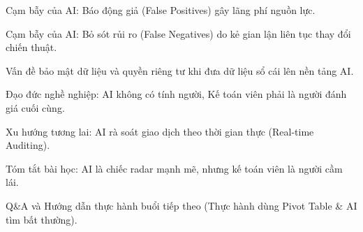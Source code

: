 \documentclass[aspectratio=169]{beamer}
\begin{document}
\begin{frame}{Cạm bẫy của AI: Báo động giả (False Positives) gây lãng phí nguồn lực.}
\end{frame}


\begin{frame}{Cạm bẫy của AI: Bỏ sót rủi ro (False Negatives) do kẻ gian lận liên tục thay đổi chiến thuật.}
\end{frame}


\begin{frame}{Vấn đề bảo mật dữ liệu và quyền riêng tư khi đưa dữ liệu sổ cái lên nền tảng AI.}
\end{frame}


\begin{frame}{Đạo đức nghề nghiệp: AI không có tính người, Kế toán viên phải là người đánh giá cuối cùng.}
\end{frame}


\begin{frame}{Xu hướng tương lai: AI rà soát giao dịch theo thời gian thực (Real-time Auditing).}
\end{frame}


\begin{frame}{Tóm tắt bài học: AI là chiếc radar mạnh mẽ, nhưng kế toán viên là người cầm lái.}
\end{frame}


\begin{frame}{Q\&A và Hướng dẫn thực hành buổi tiếp theo (Thực hành dùng Pivot Table \& AI tìm bất thường).}
\end{frame}
\end{document}
